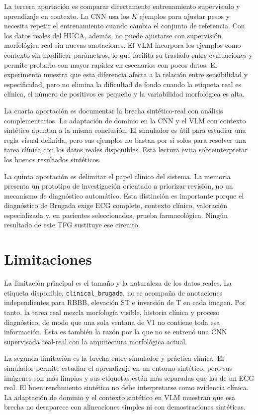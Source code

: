 La tercera aportación es comparar directamente entrenamiento supervisado y aprendizaje en contexto. La CNN usa los \(K\) ejemplos para ajustar pesos y necesita repetir el entrenamiento cuando cambia el conjunto de referencia. Con los datos reales del HUCA, además, no puede ajustarse con supervisión morfológica real sin nuevas anotaciones. El VLM incorpora los ejemplos como contexto sin modificar parámetros, lo que facilita su traslado entre evaluaciones y permite probarlo con mayor rapidez en escenarios con pocos datos. El experimento muestra que esta diferencia afecta a la relación entre sensibilidad y especificidad, pero no elimina la dificultad de fondo cuando la etiqueta real es clínica, el número de positivos es pequeño y la variabilidad morfológica es alta.

La cuarta aportación es documentar la brecha sintético-real con análisis complementarios. La adaptación de dominio en la CNN y el VLM con contexto sintético apuntan a la misma conclusión. El simulador es útil para estudiar una regla visual definida, pero sus ejemplos no bastan por sí solos para resolver una tarea clínica con los datos reales disponibles. Esta lectura evita sobreinterpretar los buenos resultados sintéticos.

La quinta aportación es delimitar el papel clínico del sistema. La memoria presenta un prototipo de investigación orientado a priorizar revisión, no un mecanismo de diagnóstico automático. Esta distinción es importante porque el diagnóstico de Brugada exige ECG completo, contexto clínico, valoración especializada y, en pacientes seleccionados, prueba farmacológica. Ningún resultado de este TFG sustituye ese circuito.

\section{Limitaciones}

La limitación principal es el tamaño y la naturaleza de los datos reales. La etiqueta disponible, \texttt{clinical\_brugada}, no se acompaña de anotaciones independientes para RBBB, elevación ST e inversión de T en cada imagen. Por tanto, la tarea real mezcla morfología visible, historia clínica y proceso diagnóstico, de modo que una sola ventana de V1 no contiene toda esa información. Esta es también la razón por la que no se entrenó una CNN supervisada real-real con la arquitectura morfológica actual.

La segunda limitación es la brecha entre simulador y práctica clínica. El simulador permite estudiar el aprendizaje en un entorno sintético, pero sus imágenes son más limpias y sus etiquetas están más separadas que las de un ECG real. El buen rendimiento sintético no debe interpretarse como evidencia clínica. La adaptación de dominio y el contexto sintético en VLM muestran que esa brecha no desaparece con alineaciones simples ni con demostraciones sintéticas.

